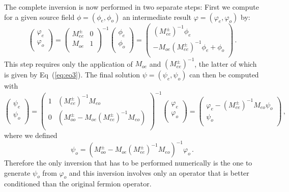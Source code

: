The complete inversion is now performed in two separate steps: First
we compute for a given source field $\phi=(\phi_e,\phi_o)$ an intermediate 
result $\varphi=(\varphi_e,\varphi_o)$ by:
\[
\begin{pmatrix}
  \varphi_e \\ \varphi_o\\
\end{pmatrix}
=
\begin{pmatrix}
  M_{ee}^\pm & 0 \\
  M_{oe}   & 1 \\
\end{pmatrix}^{-1}
\begin{pmatrix}
  \phi_e \\ \phi_o \\
\end{pmatrix}
=
\begin{pmatrix}
  (M_{ee}^\pm)^{-1} \phi_e \\ 
  -M_{oe}( M_{ee}^\pm)^{-1} \phi_e + \phi_o \\
\end{pmatrix}\, .
\]
This step requires only the application of $M_{oe}$ and
$(M_{ee}^\pm)^{-1}$, the latter of which is given by Eq~(\ref{eq:eo3}).
The final solution $\psi=(\psi_e,\psi_o)$ can then be computed with
\[
\begin{pmatrix}
  \psi_e \\ \psi_o \\
\end{pmatrix}
=
\begin{pmatrix}
  1       & (M_{ee}^\pm)^{-1}M_{eo}\\
  0       & (M_{oo}^\pm-M_{oe}(M_{ee}^\pm)^{-1}M_{eo})\\
\end{pmatrix}^{-1}
\begin{pmatrix}
  \varphi_e \\ \varphi_o \\
\end{pmatrix}
=
\begin{pmatrix}
  \varphi_e - (M_{ee}^\pm)^{-1}M_{eo}\psi_o \\ \psi_o \\
\end{pmatrix}\, ,
\]
where we defined
\[
\psi_o = (M_{oo}^\pm-M_{oe}(M_{ee}^\pm)^{-1}M_{eo})^{-1} \varphi_o\, .
\]
Therefore the only inversion that has to be performed numerically is
the one to generate $\psi_o$ from $\varphi_o$ and this inversion
involves only an operator that is better conditioned than the original
fermion operator.

